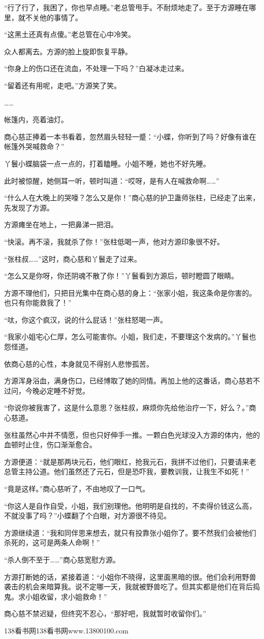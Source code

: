 \begin{this_body}
“行了行了，我困了，你也早点睡。”老总管甩手。不耐烦地走了。至于方源睡在哪里，就不关他的事情了。

“这黑土还真有点傻。”老总管在心中冷笑。

众人都离去。方源的脸上旋即恢复平静。

“你身上的伤口还在流血，不处理一下吗？”白凝冰走过来。

“留着还有用呢，走吧。”方源笑了笑。

……

帐篷内，亮着油灯。

商心慈正捧着一本书看着，忽然眉头轻轻一蹙：“小蝶，你听到了吗？好像有谁在帐篷外哭喊救命？”

丫鬟小蝶脑袋一点一点的，打着瞌睡。小姐不睡，她也不好先睡。

此时被惊醒，她侧耳一听，顿时叫道：“哎呀，是有人在喊救命啊……”

“什么人在大晚上的哭嚎？怎么又是你！”商心慈的护卫蛊师张柱，已经走了出来，先发现了方源。

方源瘫坐在地上，一把鼻涕一把泪。

“快滚。再不滚，我就杀了你！”张柱低喝一声，他对方源印象很不好。

“张柱叔……”这时，商心慈和丫鬟走了过来。

“怎么又是你呀，你还阴魂不散了你！”丫鬟看到方源后，顿时瞪圆了眼睛。

方源不理他们，只把目光集中在商心慈的身上：“张家小姐，我这条命是你害的。也只有你能救我了！”

“呔，你这个疯汉，说的什么屁话！”张柱怒喝一声。

“我家小姐宅心仁厚，怎么可能害你。小姐，我们走，不要理这个发病的。”丫鬟也怨怪道。

依商心慈的心性，本身就见不得别人悲惨孤苦。

方源浑身浴血，满身伤口，已经博取了她的同情。再加上他的这番话，商心慈若不过问，今晚必定睡不好觉。

“你说你被我害了，这是什么意思？张柱叔，麻烦你先给他治疗一下，好么？。”商心慈道。

张柱虽然心中并不情愿，但也只好伸手一推。一颗白色光球没入方源的体内，他的血顿时止住，伤口渐渐愈合。

方源便道：“就是那两块元石，他们眼红，抢我元石，我拼不过他们，只要请来老总管主持公道。他们虽然还了元石，但是恐吓我，要教训我，让我生不如死！”

“竟是这样。”商心慈听了，不由地叹了一口气。

“你这人是自作自受，小姐，我们别理他。他明明是自找的，不卖得价钱这么高，不就没事了吗？”小蝶翻了个白眼，对方源很不待见。

方源继续道：“我和同伴思来想去，就只有投靠张小姐你了。要不然我们会被他们杀死的，这可是两条人命啊！”

“杀人倒不至于……”商心慈宽慰方源。

方源打断她的话，紧接着道：“小姐你不晓得，这里面黑暗的很。他们会利用野兽袭击的机会来暗算我。说不定哪一天，我就被野兽吃了。但其实都是他们在背后捣鬼。求小姐收留，求小姐救命！”

商心慈不禁迟疑，但终究不忍心，“那好吧，我就暂时收留你们。”

138看书网138看书网www.13800100.com

\end{this_body}

